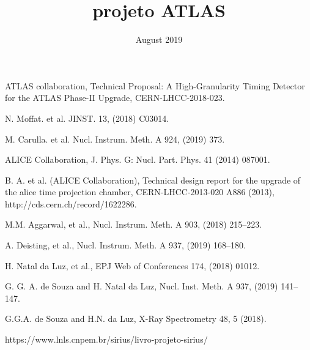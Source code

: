 \documentclass{report}
\title{projeto ATLAS}
\date{August 2019}
\begin{document}





\tableofcontents






%

\begin{thebibliography}{9}

 ATLAS collaboration, Technical Proposal: A High-Granularity Timing Detector for the ATLAS Phase-II Upgrade, CERN-LHCC-2018-023.

 N. Moffat. et al. JINST. 13, (2018) C03014.

 M. Carulla. et al. Nucl. Instrum. Meth. A 924, (2019) 373. 

 ALICE Collaboration, J. Phys. G: Nucl. Part. Phys. 41 (2014) 087001.

 B. A. et al. (ALICE Collaboration), Technical design report for the upgrade of the alice time projection chamber, CERN-LHCC-2013-020
A886 (2013), http://cds.cern.ch/record/1622286.


 M.M. Aggarwal, et al., Nucl. Instrum. Meth. A 903, (2018) 215–223. 

 A. Deisting, et al., Nucl. Instrum. Meth. A 937, (2019) 168–180.


 H. Natal da Luz, et al., EPJ Web of Conferences 174, (2018) 01012.

 G. G. A. de Souza and  H. Natal da Luz, Nucl. Inst. Meth. A 937, (2019) 141–147.

 G.G.A. de Souza and H.N. da Luz, X-Ray Spectrometry 48, 5 (2018).

 https://www.lnls.cnpem.br/sirius/livro-projeto-sirius/



\end{thebibliography}
\end{document}
